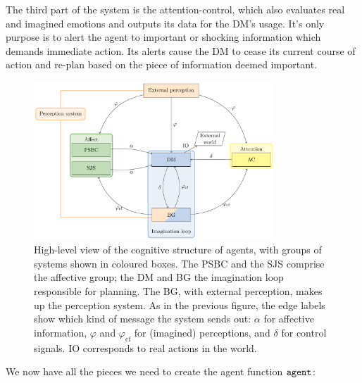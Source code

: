 The third part of the system is the attention-control, which also evaluates real and imagined emotions and outputs its data for the DM's usage. It's only purpose is to alert the agent to important or shocking information which demands immediate action. Its alerts cause the DM to cease its current course of action and re-plan based on the piece of information deemed important.

\begin{figure}
	\centering
	\includegraphics[width=0.8\textwidth]{Figs/Tikz/cognitive_system}
	\caption{High-level view of the cognitive structure of agents, with groups of systems shown in coloured boxes. The PSBC and the SJS comprise the affective group; the DM and BG the imagination loop responsible for planning. The BG, with external perception, makes up the perception system. As in the previous figure, the edge labels show which kind of message the system sends out: $\alpha$ for affective information, $\varphi$ and $\varphi_{\mathrm{cf}}$ for (imagined) perceptions, and $\delta$ for control signals. IO corresponds to real actions in the world.}
	\label{fig:cognitive_system}
\end{figure}

We now have all the pieces we need to create the agent function $\mathtt{agent}$:

